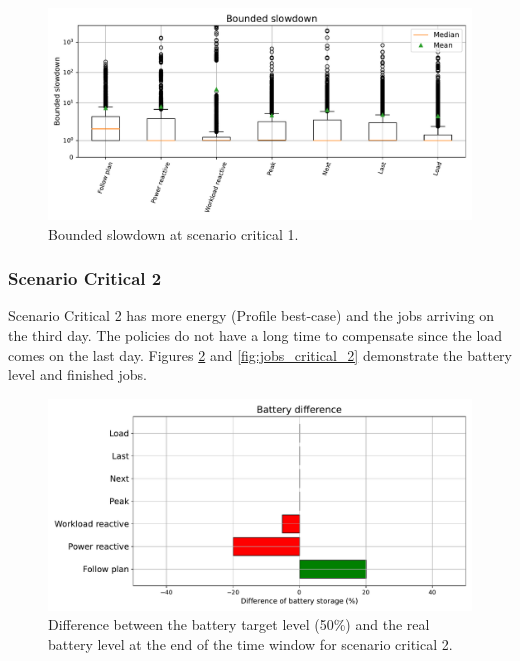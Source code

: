 \begin{figure}[!htb]
    \centering
    \includegraphics[scale=0.55]{Images/Compensations/slowdown_critical_1.pdf}
    \caption{Bounded slowdown at scenario critical 1.}
    \label{fig:slowdown_critical_1}
\end{figure}


\subsubsection{Scenario Critical 2}

Scenario Critical 2 has more energy (Profile best-case) and the jobs arriving on the third day. The policies do not have a long time to compensate since the load comes on the last day. Figures \ref{fig:SoC_critical_2} and \ref{fig:jobs_critical_2} demonstrate the battery level and finished jobs. 

\begin{figure}[!htb]
    \centering
    \includegraphics[scale=0.55]{Images/Compensations/battery_critical_2.pdf}
    \caption{Difference between the battery target level (50\%) and the real battery level at the end of the time window for scenario critical 2.}
    \label{fig:SoC_critical_2}
\end{figure}

